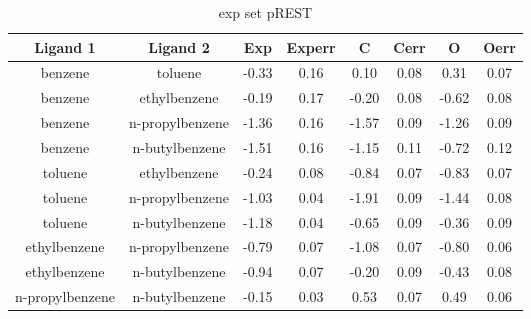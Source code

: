 \documentclass[T4paper.tex]{subfiles}
\begin{document}
\begin{table}[]
\centering
\caption{exp set pREST}
\label{tbl:exp_pREST_set}
\begin{tabular}{|c|c|c|c|c|c|c|c|}
\hline
Ligand 1                                & Ligand 2                                & \textbf{Exp} & \textbf{Experr} & \textbf{C} & \textbf{Cerr} & \textbf{O} & \textbf{Oerr} \\ \hline
\cellcolor[HTML]{6434FC}benzene         & \cellcolor[HTML]{6434FC}toluene         & -0.33        & 0.16            & 0.10       & 0.08          & 0.31       & 0.07          \\ \hline
\cellcolor[HTML]{6434FC}benzene         & \cellcolor[HTML]{6434FC}ethylbenzene    &-0.19 & 0.17  & -0.20 & 0.08  & -0.62 & 0.08          \\ \hline
\cellcolor[HTML]{6434FC}benzene         & \cellcolor[HTML]{6434FC}n-propylbenzene & -1.36 & 0.16 & -1.57 & 0.09  & -1.26 & 0.09         \\ \hline
\cellcolor[HTML]{6434FC}benzene         & \cellcolor[HTML]{6434FC}n-butylbenzene  & -1.51 & 0.16 & -1.15 & 0.11  & -0.72 & 0.12         \\ \hline
\cellcolor[HTML]{6434FC}toluene         & \cellcolor[HTML]{6434FC}ethylbenzene    & -0.24 & 0.08  & -0.84 & 0.07  & -0.83 & 0.07          \\ \hline
\cellcolor[HTML]{6434FC}toluene         & \cellcolor[HTML]{6434FC}n-propylbenzene & -1.03 & 0.04  & -1.91 & 0.09  & -1.44 & 0.08          \\ \hline
\cellcolor[HTML]{6434FC}toluene         & \cellcolor[HTML]{6434FC}n-butylbenzene  & -1.18 & 0.04  & -0.65 & 0.09  & -0.36 & 0.09         \\ \hline
\cellcolor[HTML]{6434FC}ethylbenzene    & \cellcolor[HTML]{6434FC}n-propylbenzene & -0.79 & 0.07  & -1.08 & 0.07  & -0.80 & 0.06         \\ \hline
\cellcolor[HTML]{6434FC}ethylbenzene    & \cellcolor[HTML]{6434FC}n-butylbenzene  & -0.94 & 0.07  & -0.20 & 0.09  & -0.43 & 0.08         \\ \hline
\cellcolor[HTML]{6434FC}n-propylbenzene & \cellcolor[HTML]{6434FC}n-butylbenzene  & -0.15 & 0.03  & 0.53  & 0.07  & 0.49  & 0.06       \\ \hline
\end{tabular}
\end{table}
\end{document}
